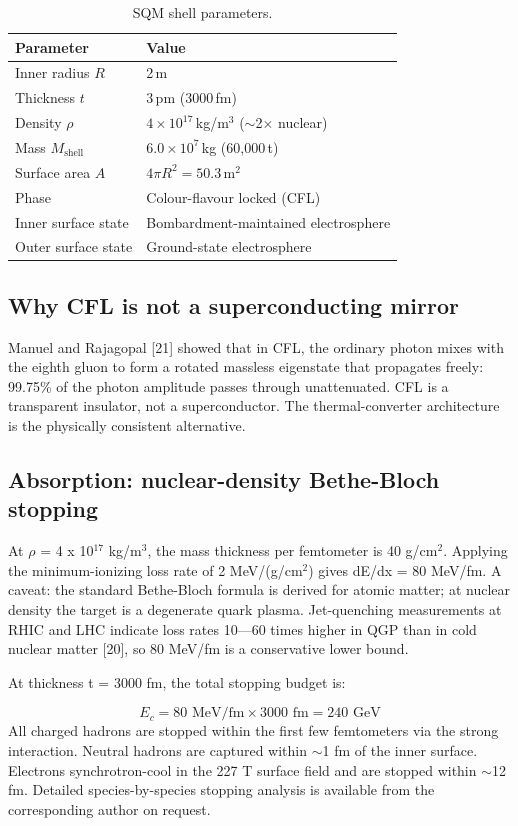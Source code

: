 \documentclass[12pt,a4paper]{article}
\begin{document}
\begin{table}[h]
\centering
\caption{SQM shell parameters.}
\label{tab:shell}
\small
\begin{tabular}{ll}
\hline
\textbf{Parameter} & \textbf{Value} \\
\hline
Inner radius $R$ & 2\,m \\
Thickness $t$ & 3\,pm (3000\,fm) \\
Density $\rho$ & $4 \times 10^{17}$\,kg/m$^3$ ($\sim$2$\times$ nuclear) \\
Mass $M_\text{shell}$ & $6.0 \times 10^7$\,kg (60,000\,t) \\
Surface area $A$ & $4\pi R^2 = 50.3$\,m$^2$ \\
Phase & Colour-flavour locked (CFL) \\
Inner surface state & Bombardment-maintained electrosphere \\
Outer surface state & Ground-state electrosphere \\
\hline
\end{tabular}
\end{table}

\subsection{Why CFL is not a superconducting mirror}
Manuel and Rajagopal [21] showed that in CFL, the ordinary photon mixes with the eighth gluon to form a rotated massless eigenstate that propagates freely: 99.75\% of the photon amplitude passes through unattenuated. CFL is a transparent insulator, not a superconductor. The thermal-converter architecture is the physically consistent alternative.

\subsection{Absorption: nuclear-density Bethe-Bloch stopping}
At $\rho$ = 4 x 10$^{17}$ kg/m$^{3}$, the mass thickness per femtometer is 40 g/cm$^{2}$. Applying the minimum-ionizing loss rate of 2 MeV/(g/cm$^{2}$) gives dE/dx = 80 MeV/fm. A caveat: the standard Bethe-Bloch formula is derived for atomic matter; at nuclear density the target is a degenerate quark plasma. Jet-quenching measurements at RHIC and LHC indicate loss rates 10---60 times higher in QGP than in cold nuclear matter [20], so 80 MeV/fm is a conservative lower bound.

At thickness t = 3000 fm, the total stopping budget is:

\begin{equation}
E_c = 80 \text{ MeV/fm} \times 3000 \text{ fm} = 240 \text{ GeV}
\end{equation}
All charged hadrons are stopped within the first few femtometers via the strong interaction. Neutral hadrons are captured within $\sim$1 fm of the inner surface. Electrons synchrotron-cool in the 227 T surface field and are stopped within $\sim$12 fm. Detailed species-by-species stopping analysis is available from the corresponding author on request.
\end{document}
